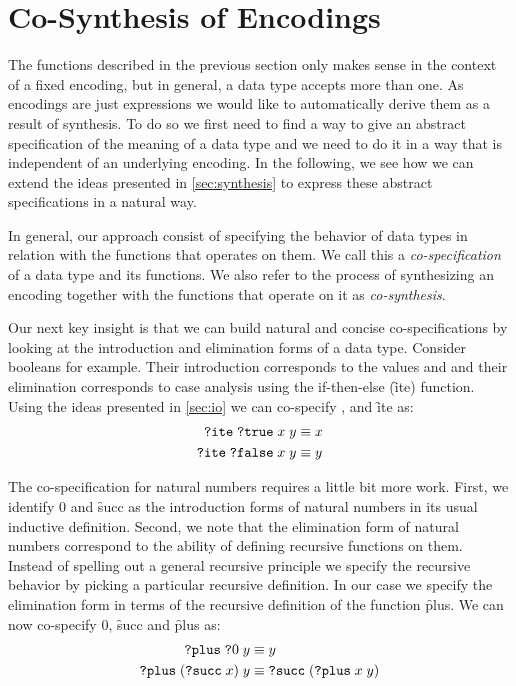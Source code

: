\section{Co-Synthesis of Encodings} \label{sec:co-synthesis}
%
The functions described in the previous section only makes
sense in the context of a fixed encoding, but in general, a
data type accepts more than one.
%
As encodings are just expressions we would like to
automatically derive them as a result of synthesis.
%
To do so we first need to find a way to give an abstract
specification of the meaning of a data type and we need to
do it in a way that is independent of an underlying
encoding.
%
In the following, we see how we can extend the ideas
presented in \cref{sec:synthesis} to express these abstract
specifications in a natural way.

In general, our approach consist of specifying the behavior
of data types in relation with the functions that operates
on them.
%
We call this a \emph{co-specification} of a data type and
its functions.
%
We also refer to the process of synthesizing an encoding
together with the functions that operate on it as
\emph{co-synthesis}.

Our next key insight is that we can build natural and
concise co-specifications by looking at the introduction and
elimination forms of a data type.
%
Consider booleans for example.
%
Their introduction corresponds to the values \true and \false
and their elimination corresponds to case analysis using the
if-then-else (\f{ite}) function.
%
Using the ideas presented in \cref{sec:io} we can co-specify
\true, \false and \f{ite} as:
%
\begin{align*}
  \texttt{?ite}\;\texttt{?true}\;x\;y &\equiv x \\
  \texttt{?ite}\;\texttt{?false}\;x\;y &\equiv y
\end{align*}

The co-specification for natural numbers requires a little
bit more work.
%
First, we identify $0$ and \f{succ} as the introduction
forms of natural numbers in its usual inductive definition.
%
Second, we note that the elimination form of natural numbers
correspond to the ability of defining recursive functions on
them.
%
Instead of spelling out a general recursive principle we
specify the recursive behavior by picking a particular
recursive definition.
%
In our case we specify the elimination form in terms of the
recursive definition of the function \f{plus}.
%
We can now co-specify $0$, \f{succ} and \f{plus} as:
\begin{align*}
  \texttt{?plus}\;\texttt{?}0\;y &\equiv y\\
  \texttt{?plus}\;(\texttt{?succ}\;x)\;y &\equiv \texttt{?succ}\;(\texttt{?plus}\;x\;y)\\
\end{align*}

